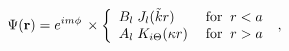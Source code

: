 \begin{equation}
 \Psi
  ({\bf r})=
e^{i m \phi}
\, \times
\left\{\begin{array}{lr}
    B_{l} \; 
J_{l}  (\tilde k r)  
\;  & \textrm{for} 
\;\;    r < a \\ 
   A_{l} \; K_{i \Theta}  (\kappa r)  
\;   & \textrm{for}  \;\;  r  > a 
\\
  \end{array}\right. 
\;  ,
\label{eq:wf_2D_ISP_circular_well_reg}
\end{equation}

